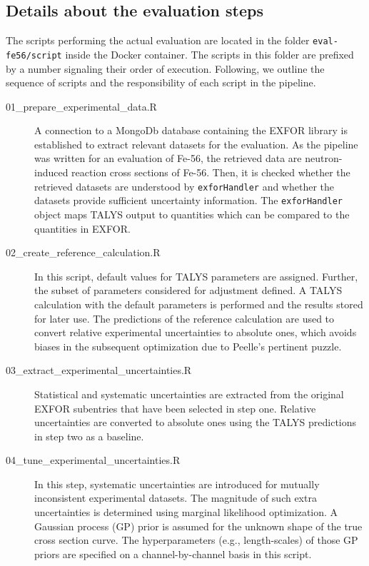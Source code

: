 \documentclass[12pt,a4paper]{scrartcl}
\begin{document}
 
 \subsection{Details about the evaluation steps} 
 \label{subsec:evaluation_steps}
 The scripts performing the actual evaluation are located in the folder \verb#eval-fe56/script# inside the Docker container.
 The scripts in this folder are prefixed by a number signaling their order of execution.
 Following, we outline the sequence of scripts and the responsibility of each script in the pipeline.
 \begin{description}
 \item[01\_prepare\_experimental\_data.R]
 A connection to a MongoDb database containing the EXFOR library is established to extract relevant datasets for the evaluation.
 As the pipeline was written for an evaluation of Fe-56, the retrieved  data are neutron-induced reaction cross sections of Fe-56.
 Then, it is checked whether the retrieved datasets are understood by  \verb#exforHandler# and whether the datasets provide sufficient uncertainty information.
 The \verb#exforHandler# object maps TALYS output to quantities which can be compared to the quantities in EXFOR.
 
 \item[02\_create\_reference\_calculation.R]
 In this script, default values for TALYS parameters are assigned.
 Further, the subset of parameters considered for adjustment defined.
 A TALYS calculation with the default parameters is performed and the results stored for later use.
 The predictions of the reference calculation are used to convert relative experimental uncertainties to absolute ones, which avoids biases in the subsequent optimization due to Peelle's pertinent puzzle.
 
 \item[03\_extract\_experimental\_uncertainties.R]
 Statistical and systematic uncertainties are extracted from the original EXFOR subentries that have been selected in step one.
 Relative uncertainties are converted to absolute ones using the TALYS predictions in step two as a baseline.
 
 \item[04\_tune\_experimental\_uncertainties.R]
 In this step, systematic uncertainties are introduced for mutually inconsistent experimental datasets.
 The magnitude of such extra uncertainties is determined using marginal likelihood optimization.
 A Gaussian process (GP) prior is assumed for the unknown shape of the true cross section curve.
 The hyperparameters (e.g., length-scales) of those GP priors are specified on a channel-by-channel basis in this script.
 

\end{description}
\end{document}
